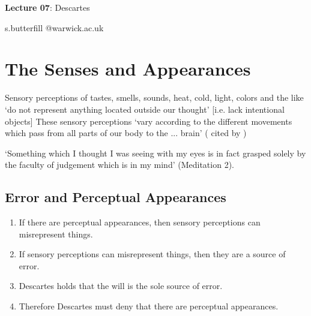 \documentclass[12pt]{extarticle}
\date{}
\makeatletter
\def \ititle {Descartes}
\def \isubtitle {Lecture 02}
\def \iemail{s.butterfill @warwick.ac.uk}
\makeatother
\begin{document}
\begin{multicols*}{3}

\setlength\footnotesep{1em}









      
\def \ititle {Lecture 07}
 
\def \isubtitle {Descartes}
 
\begin{center}
 
{\Large
 
\textbf{\ititle}: \isubtitle
 
}
 
 
 
\iemail %
 
\end{center}
 
 
 
\section{The Senses and Appearances}
 
Sensory perceptions of tastes, smells, sounds, heat, cold, light, colors and the like ‘do not represent anything located outside our thought’  [i.e. lack intentional objects]
These sensory perceptions ‘vary according to the different movements which pass 
from all parts of our body to the ... brain’
(\citealp[p.~ 219, AT VIII:35]{descartes:1985_csm1} cited by \citealp[p.~348]{simmons:1999_are})
 
‘Something which I thought I was seeing with my eyes is in fact grasped solely by the faculty of
judgement which is in my mind’
(Meditation 2).


\subsection{Error and Perceptual Appearances}
\begin{enumerate}
\item If there are perceptual appearances, then sensory perceptions can misrepresent things.
\item If sensory perceptions can misrepresent things, then they are a source of error.
\item Descartes holds that the will is the sole source of error.
\item Therefore Descartes must deny that there are perceptual appearances.
\end{enumerate}


\end{multicols*}
\end{document}
